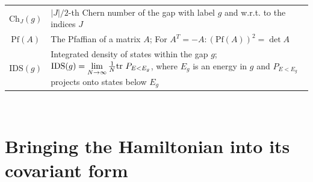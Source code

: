 \documentclass[
    10pt,
    aps,
    prb,
    twocolumn,
    floatfix,
    superscriptaddress,
]{revtex4-2}
\begin{document}
\begin{table}[t!]
\begin{tabular}{c|p{15cm}}
	$\mathrm{Ch}_J(g) $ &  $|J|/2$-th Chern number of the gap with label $g$ and w.r.t. to the indices $J$ \\
	$\mathrm{Pf}(A)$ &  The Pfaffian of a matrix $A$; For $A^T = -A\colon (\mathrm{Pf}(A))^2 = \det A$ \\
	$\mathrm{IDS}(g)$ & Integrated density of states within the gap $g$; $\mathrm{IDS}(g) = \lim\limits_{N\to\infty}  \frac{1}{N} \mathrm{tr}~P_{E<E_g}$, where $E_g$ is an energy in $g$ and $P_{E<E_g}$ projects onto states below $E_g$
\\ \bottomrule
	\end{tabular}\\
\end{table}




\section{Bringing the Hamiltonian into its covariant form}
\label{app:covariant_form}
\end{document}
